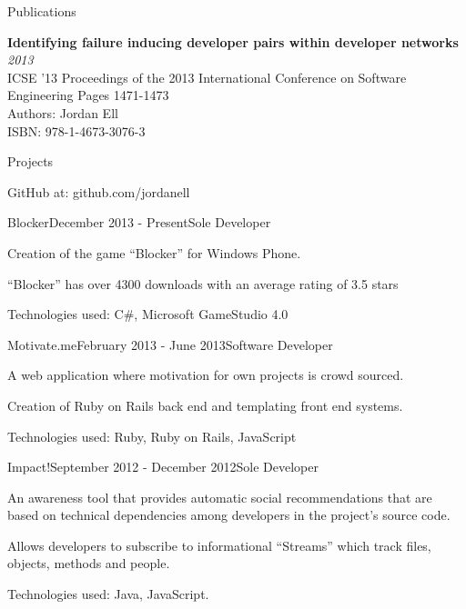\documentclass{resume} %
\begin{document}

\begin{rSection}{Publications}

{\bf Identifying failure inducing developer pairs within developer networks} \hfill {\em2013} \\
ICSE '13 Proceedings of the 2013 International Conference on Software Engineering Pages 1471-1473 \\
Authors: Jordan Ell \\
ISBN: 978-1-4673-3076-3

\end{rSection}


\begin{rSection}{Projects}

GitHub at: github.com/jordanell

\begin{rSubsection}{Blocker}{December 2013 - Present}{Sole Developer}{}
\item Creation of the game ``Blocker'' for Windows Phone.
\item ``Blocker'' has over 4300 downloads with an average rating of 3.5 stars
\item Technologies used: C\#, Microsoft GameStudio 4.0
\end{rSubsection}

\begin{rSubsection}{Motivate.me}{February 2013 - June 2013}{Software Developer}{}
\item A web application where motivation for own projects is crowd sourced.
\item Creation of Ruby on Rails back end and templating front end systems.
\item Technologies used: Ruby, Ruby on Rails, JavaScript
\end{rSubsection}

\begin{rSubsection}{Impact!}{September 2012 - December 2012}{Sole Developer}{}
\item An awareness tool that provides automatic social recommendations that are based on technical dependencies among developers in the project's source code.
\item Allows developers to subscribe to informational ``Streams'' which track files, objects, methods and people.
\item Technologies used: Java, JavaScript.
\end{rSubsection}

\end{rSection}
\end{document}
